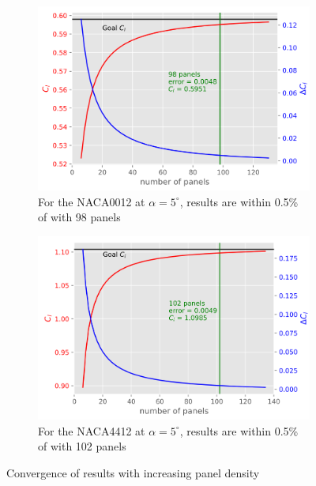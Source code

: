 \begin{figure}[h]
  \centering
  \begin{subfigure}{.5\textwidth}
    \centering
    \captionsetup{width=.8\linewidth}
    \includegraphics[width=.9\linewidth]{static/conv_thick_sym.png}
    \caption{For the NACA0012 at $\alpha = 5^{\circ}$, results are within 0.5\% of \xfoil with 98 panels}
    \label{fig:thick_panels1}
  \end{subfigure}%
  \begin{subfigure}{.5\textwidth}
    \centering
    \captionsetup{width=.8\linewidth}
    \includegraphics[width=.9\linewidth]{static/conv_thick.png}
    \caption{For the NACA4412 at $\alpha = 5^{\circ}$, results are within 0.5\% of \xfoil with 102 panels}
    \label{fig:thick_panels2}
  \end{subfigure}
  \caption{\centering Convergence of results with increasing panel density}
  \label{fig:thick_panels}
\end{figure}
